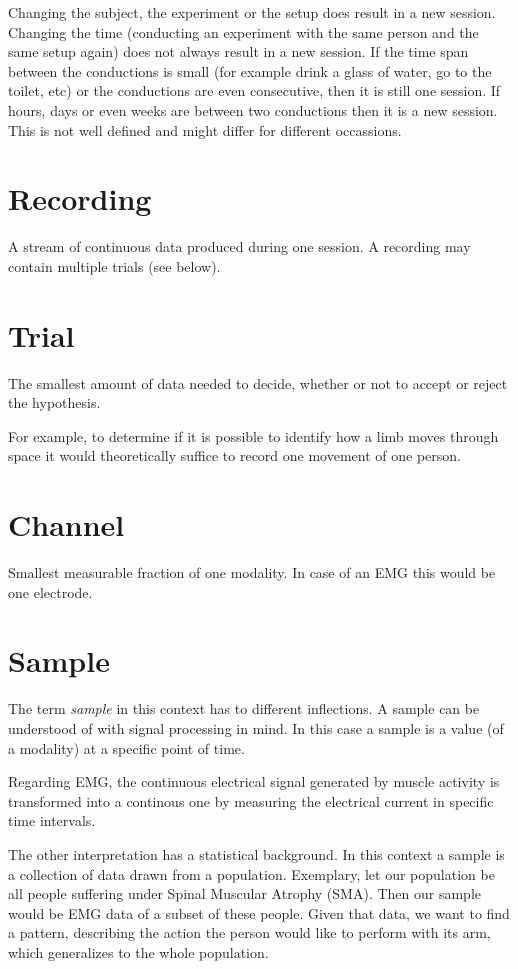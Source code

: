 \documentclass[letterpaper,10pt,english]{sphinxmanual}
\begin{document}
Changing the subject, the experiment or the setup does result in a new session.
Changing the time (conducting an experiment with the same person and the same
setup again) does not always result in a new session. If the time span between
the conductions is small (for example drink a glass of water, go to the toilet,
etc) or the conductions are even consecutive, then it is still one session. If
hours, days or even weeks are between two conductions then it is a new session.
This is not well defined and might differ for different occassions.


\section{Recording}
\label{taxonomy:recording}
A stream of continuous data produced during one session. A recording may contain
multiple trials (see below).


\section{Trial}
\label{taxonomy:trial}
The smallest amount of data needed to decide, whether or not to accept or reject
the hypothesis.

For example, to determine if it is possible to identify how a limb moves through
space it would theoretically suffice to record one movement of one person.


\section{Channel}
\label{taxonomy:channel}
Smallest measurable fraction of one modality. In case of an EMG this would be
one electrode.


\section{Sample}
\label{taxonomy:sample}
The term \emph{sample} in this context has to different inflections. A sample can be
understood of with signal processing in mind. In this case a sample is a value
(of a modality) at a specific point of time.

Regarding EMG, the continuous electrical signal generated by muscle activity
is transformed into a continous one by measuring the electrical current in
specific time intervals.

The other interpretation has a statistical background. In this context a
sample is a collection of data drawn from a population. Exemplary, let our
population be all people suffering under Spinal Muscular Atrophy (SMA). Then
our sample would be EMG data of a subset of these people. Given that data, we
want to find a pattern, describing the action the person would like to perform
with its arm, which generalizes to the whole population.
\end{document}
